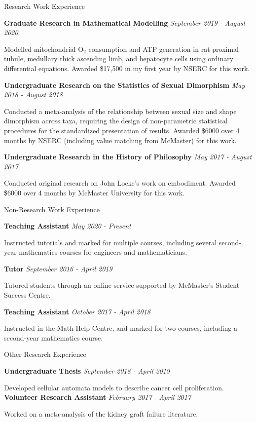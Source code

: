 \documentclass{resume} %
\begin{document}
\begin{rSection}{Research Work Experience}

{\bf Graduate Research in Mathematical Modelling} \hfill {\em September 2019 - August 2020}

Modelled mitochondrial O$_2$ consumption and ATP generation in rat proximal tubule, medullary thick ascending limb, and hepatocyte cells using ordinary differential equations.  Awarded \$17,500 in my first year by NSERC for this work.

{\bf Undergraduate Research on the Statistics of Sexual Dimorphism} \hfill {\em May 2018 - August 2018}

Conducted a meta-analysis of the relationship between sexual size and shape dimorphism across taxa, requiring the design of non-parametric statistical procedures for the standardized presentation of results.  Awarded \$6000 over 4 months by NSERC (including value matching from McMaster) for this work.

{\bf Undergraduate Research in the History of Philosophy} \hfill {\em May 2017 - August 2017}

Conducted original research on John Locke's work on embodiment.  Awarded \$6000 over 4 months by McMaster University for this work.

\end{rSection}

\begin{rSection}{Non-Research Work Experience}

{\bf Teaching Assistant} \hfill {\em May 2020 - Present}

Instructed tutorials and marked for multiple courses, including several second-year mathematics courses for engineers and mathematicians.

{\bf Tutor} \hfill {\em September 2016 - April 2019}

Tutored students through an online service supported by McMaster's Student Success Centre.

{\bf Teaching Assistant} \hfill {\em October 2017 - April 2018}

Instructed in the Math Help Centre, and marked for two courses, including a second-year mathematics course.

\end{rSection}

\begin{rSection}{Other Research Experience}

{\bf Undergraduate Thesis} \hfill {\em September 2018 - April 2019}

Developed cellular automata models to describe cancer cell proliferation.\\

{\bf Volunteer Research Assistant} \hfill {\em February 2017 - April 2017}

Worked on a meta-analysis of the kidney graft failure literature.

\end{rSection}
\end{document}
